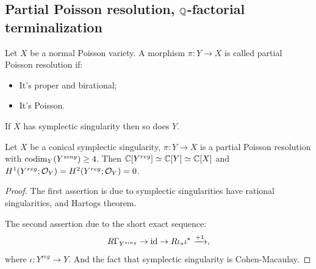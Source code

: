 

\subsection{Partial Poisson resolution, $\mathbb{Q}$-factorial terminalization}


\begin{defn}
  Let $X$ be a normal Poisson variety. A morphism $\pi: Y \to X$ is called partial Poisson resolution if:
  \begin{itemize}
    \item It's proper and birational;
    \item It's Poisson.
  \end{itemize}
\end{defn}

\begin{prop}
  If $X$ has symplectic singularity then so does $Y$.
\end{prop}

\begin{prop}
  Let $X$ be a conical symplectic singularity, $\pi: Y \to X$ is a partial Poisson resolution with $\operatorname{codim}_Y(Y^{sing}) \geq 4$. Then $\mathbb{C}[Y^{reg}] \simeq \mathbb{C}[Y] \simeq \mathbb{C}[X]$ and $H^1(Y^{reg};\mathcal{O}_Y) = H^2(Y^{reg};\mathcal{O}_Y) = 0$.
\end{prop}

\begin{proof}
  The first assertion is due to symplectic singularities have rational singularities, and Hartogs theorem.

  The second assertion due to the short exact sequence:
  \[
     R\Gamma_{Y^{sing}} \to \operatorname{id} \to R\iota_{*}\iota^* \xrightarrow{+1} ,
  \]
  where $\iota: Y^{reg} \to Y$.
  And the fact that symplectic singularity is Cohen-Macaulay.
\end{proof}

